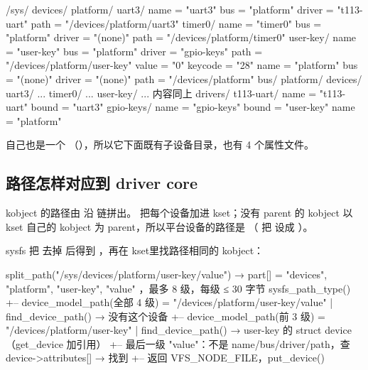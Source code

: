 \begin{txtcode}
/sys/
  devices/
    platform/
      uart3/
        name  = "uart3"
        bus  = "platform"
        driver  = "t113-uart"
        path  = "/devices/platform/uart3"
      timer0/
        name  = "timer0"
        bus  = "platform"
        driver  = "(none)"
        path  = "/devices/platform/timer0"
      user-key/
        name  = "user-key"
        bus  = "platform"
        driver  = "gpio-keys"
        path  = "/devices/platform/user-key"
        value  = "0"
        keycode  = "28"
      name  = "platform"
      bus  = "(none)"
      driver  = "(none)"
      path  = "/devices/platform"
  bus/
    platform/
      devices/
        uart3/ ...  timer0/ ...  user-key/ ...      内容同上
      drivers/
        t113-uart/
          name  = "t113-uart"
          bound  = "uart3"
        gpio-keys/
          name  = "gpio-keys"
          bound  = "user-key"
      name  = "platform"
\end{txtcode}

 自己也是一个 （），所以它下面既有子设备目录，也有 4 个属性文件。

\subsection{路径怎样对应到 driver core}

kobject 的路径由  沿  链拼出。 把每个设备加进  kset；没有 parent 的 kobject 以 kset 自己的 kobject 为 parent，所以平台设备的路径是 （ 把 设成 ）。

sysfs 把  去掉  后得到 ，再在  kset里找路径相同的 kobject：

\begin{txtcode}
split_path("/sys/devices/platform/user-key/value")
  → part[] = { "devices", "platform", "user-key", "value" }，最多 8 级，每级 ≤ 30 字节
sysfs_path_type()
  +-- device_model_path(全部 4 级) = "/devices/platform/user-key/value"
  |   find_device_path() → 没有这个设备
  +-- device_model_path(前 3 级)   = "/devices/platform/user-key"
  |   find_device_path() → user-key 的 struct device（get_device 加引用）
  +-- 最后一级 "value"：不是 name/bus/driver/path，查 device->attributes[] → 找到
  +-- 返回 VFS_NODE_FILE，put_device()
\end{txtcode}

